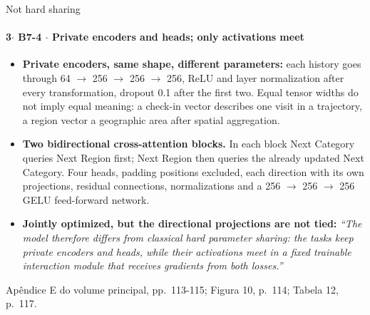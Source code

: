 \documentclass{beamer}
\begin{document}
\begin{frame}[noframenumbering]{Not hard sharing}
    \framesubtitle{\normalsize 3$\cdot$ \textbf{B7-4} $\cdot$ Private encoders and heads; only activations meet}
    \hypertarget{b74}{}
    \small
    \begin{itemize}\setlength{\itemsep}{0pt}\setlength{\parskip}{0pt}
        \item \textbf{Private encoders, same shape, different parameters:} each history goes through 64 $\to$ 256 $\to$ 256 $\to$ 256, ReLU and layer normalization after every transformation, dropout 0.1 after the first two. Equal tensor widths do not imply equal meaning: a check-in vector describes one visit in a trajectory, a region vector a geographic area after spatial aggregation.
        \item \textbf{Two bidirectional cross-attention blocks.} In each block Next Category queries Next Region first; Next Region then queries the already updated Next Category. Four heads, padding positions excluded, each direction with its own projections, residual connections, normalizations and a 256 $\to$ 256 $\to$ 256 GELU feed-forward network.
        \item \textbf{Jointly optimized, but the directional projections are not tied:} \textit{``The model therefore differs from classical hard parameter sharing: the tasks keep private encoders and heads, while their activations meet in a fixed trainable interaction module that receives gradients from both losses.''}
    \end{itemize}
    \vfill
    {\scriptsize
    \begin{minipage}[b]{0.775\linewidth}\raggedright\textcolor{black!70}{Apêndice E do volume principal, pp.~113-115; Figura 10, p.~114; Tabela 12, p.~117.}\end{minipage}\hfill
    \begin{minipage}[b]{0.20\linewidth}\raggedleft \hyperlink{b0}{}\end{minipage}}
\end{frame}
\end{document}

